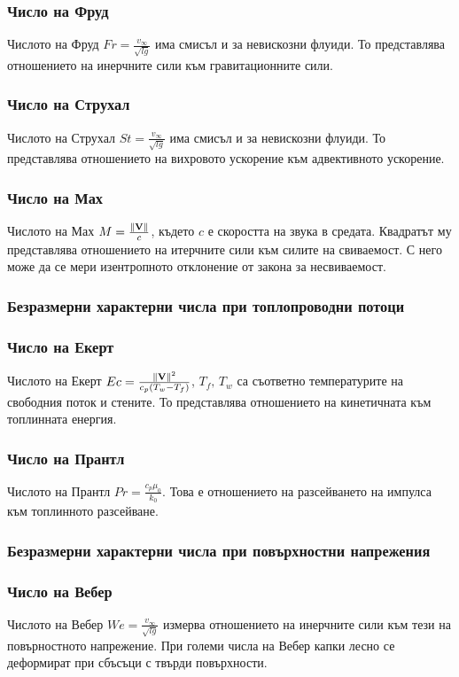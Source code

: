 \documentclass[bulgarian, 12pt]{article}
\begin{document}
\subsubsection{Число на Фруд}
Числото на Фруд $Fr = \frac{v_\infty}{\sqrt{l g}}$ има смисъл и за невискозни флуиди.
То представлява отношението на инерчните сили към гравитационните сили.
\subsubsection{Число на Струхал}
Числото на Струхал $St = \frac{v_\infty}{\sqrt{l g}}$ има смисъл и за невискозни флуиди.
То представлява отношението на вихровото ускорение към адвективното ускорение.
\subsubsection{Число на Мах}
Числото на Мах $M = \frac{\norm{\mathbf{V}}}{c}$, където $c$ е скоростта на звука в средата.
Квадратът му представлява отношението на итерчните сили към силите на свиваемост.
С него може да се мери изентропното отклонение от закона за несвиваемост.

\subsubsection{Безразмерни характерни числа при топлопроводни потоци}
\subsubsection{Число на Екерт}
Числото на Екерт $Ec = \frac{\norm{\mathbf{V}}^2}{c_p(T_w - T_f)}$, $T_f,\, T_w$ са съответно температурите на свободния поток и стените.
То представлява отношението на кинетичната към топлинната енергия.
\subsubsection{Число на Прантл}
Числото на Прантл $Pr = \frac{c_p \mu_0}{k_0}$.
Това е отношението на разсейването на импулса към топлинното разсейване.

\subsubsection{Безразмерни характерни числа при повърхностни напрежения}
\subsubsection{Число на Вебер}
Числото на Вебер $We = \frac{v_\infty}{\sqrt{l g}}$ измерва отношението на инерчните сили към тези на повърностното напрежение.
При големи числа на Вебер капки лесно се деформират при сбъсъци с твърди повърхности.
\end{document}
